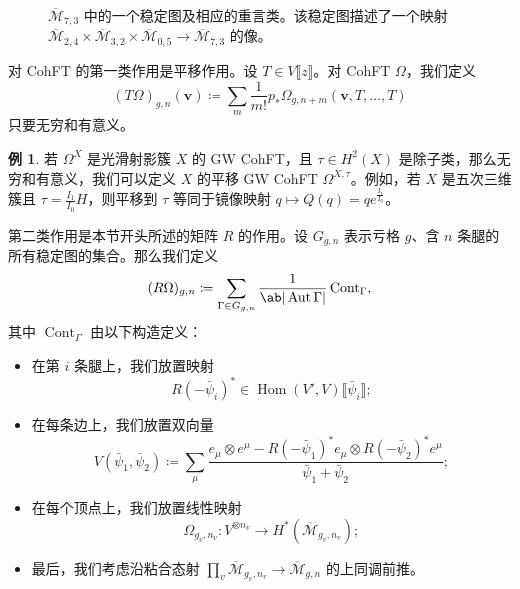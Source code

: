 \documentclass{amsart}
\theoremstyle{definition}
\newtheorem{exm}[thm]{例}
\theoremstyle{remark}
\theoremstyle{plain}
\theoremstyle{definition}
\theoremstyle{remark}
\newcommand{\Mbar}{\overline{\mathcal{M}}}
\newcommand{\mc}[1]{\mathcal{#1}}
\newcommand{\mbf}[1]{\mathbf{#1}}
\newcommand{\bv}{\mbf{v}}
\newcommand{\on}[1]{\operatorname{#1}}
\newcommand{\ol}[1]{\overline{#1}}
\newcommand{\1}{\mathbf{1}}
\newcommand{\2}{\mathbf{2}}
\newcommand{\3}{\mathbf{3}}
\newcommand{\ps}[1]{\llbracket #1 \rrbracket}
\DeclareMathOperator{\Hom}{Hom}
\DeclareMathOperator{\Aut}{Aut}
\begin{document}
\begin{figure}[htpb]
  \centering
  \caption{$\ol{\mc{M}}_{7,3}$ 中的一个稳定图及相应的重言类。该稳定图描述了一个映射
    $\ol{\mc{M}}_{2,4} \times \ol{\mc{M}}_{3,2} \times \ol{\mc{M}}_{0,5} \to \ol{\mc{M}}_{7,3}$ 的像。}
  \label{fig:stablegraph}
\end{figure}

对 CohFT 的第一类作用是平移作用。设 $T \in V\ps{z}$。对 CohFT $\Omega$，我们定义
\[ (T\Omega)_{g,n}(\bv) \coloneqq \sum_m \frac{1}{m!} p_* \Omega_{g,n+m}(\bv, T,\ldots,T) \]
只要无穷和有意义。

\begin{exm}
    若 $\Omega^X$ 是光滑射影簇 $X$ 的 GW CohFT，且 $\tau \in H^2(X)$ 是除子类，那么无穷和有意义，我们可以定义 $X$ 的平移 GW CohFT $\Omega^{X,\tau}$。例如，若 $X$ 是五次三维簇且 $\tau = \frac{I_1}{I_0} H$，则平移到 $\tau$ 等同于镜像映射 $q \mapsto Q(q) = q e^{\frac{I_1}{I_0}}$。
\end{exm}

第二类作用是本节开头所述的矩阵 $R$ 的作用。设 $G_{g,n}$ 表示亏格 $g$、含 $n$ 条腿的所有稳定图的集合。那么我们定义
\[ (R\Omega)_{g,n} \coloneqq \sum_{\Gamma \in G_{g,n}} \frac{1}{\ab|\Aut \Gamma|} \on{Cont}_{\Gamma}, \]
其中 $\on{Cont}_{\Gamma}$ 由以下构造定义：
\begin{itemize}
    \item 在第 $i$ 条腿上，我们放置映射
        \[ R(-\bar{\psi}_i)^* \in \Hom(V',V) \ps{\bar{\psi}_i}; \]
    \item 在每条边上，我们放置双向量
        \[ V(\bar{\psi}_1, \bar{\psi}_2) \coloneqq \sum_{\mu} \frac{e_{\mu} \otimes e^{\mu} - R(-\bar{\psi}_1)^* e_{\mu} \otimes R(-\bar{\psi}_2)^* e^{\mu}}{\bar{\psi}_1 + \bar{\psi}_2}; \]
    \item 在每个顶点上，我们放置线性映射
        \[ \Omega_{g_v, n_v} \colon V^{\otimes n_v} \to H^*(\Mbar_{g_v, n_v}); \]
    \item 最后，我们考虑沿粘合态射 $\prod_v \Mbar_{g_v, n_v} \to \Mbar_{g,n}$ 的上同调前推。
\end{itemize}
\end{document}

